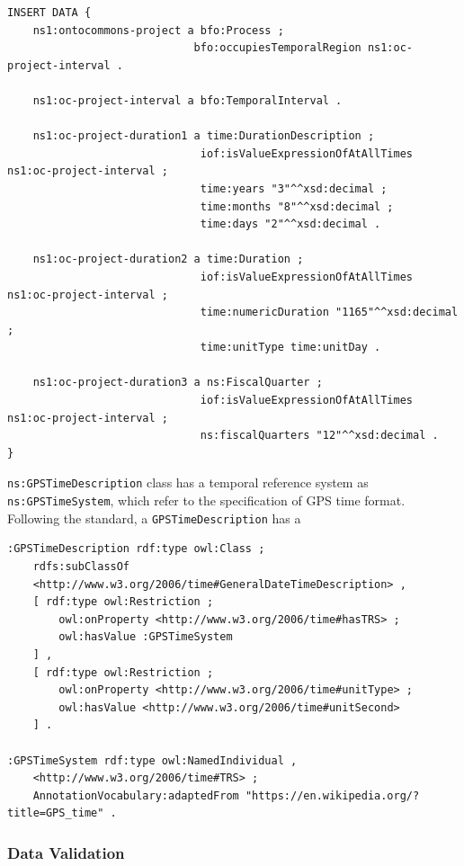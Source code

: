 \begin{verbatim}
INSERT DATA {
    ns1:ontocommons-project a bfo:Process ;
                             bfo:occupiesTemporalRegion ns1:oc-project-interval .

    ns1:oc-project-interval a bfo:TemporalInterval .

    ns1:oc-project-duration1 a time:DurationDescription ;
                              iof:isValueExpressionOfAtAllTimes ns1:oc-project-interval ;
                              time:years "3"^^xsd:decimal ;
                              time:months "8"^^xsd:decimal ;
                              time:days "2"^^xsd:decimal .

    ns1:oc-project-duration2 a time:Duration ;
                              iof:isValueExpressionOfAtAllTimes ns1:oc-project-interval ;
                              time:numericDuration "1165"^^xsd:decimal ;
                              time:unitType time:unitDay .

    ns1:oc-project-duration3 a ns:FiscalQuarter ;
                              iof:isValueExpressionOfAtAllTimes ns1:oc-project-interval ;
                              ns:fiscalQuarters "12"^^xsd:decimal .
}
\end{verbatim}

\texttt{ns:GPSTimeDescription} class has a temporal reference system as \texttt{ns:GPSTimeSystem}, which refer to the specification of GPS time format. Following the standard, a \texttt{GPSTimeDescription} has a 

\begin{verbatim}
:GPSTimeDescription rdf:type owl:Class ;
    rdfs:subClassOf 
    <http://www.w3.org/2006/time#GeneralDateTimeDescription> ,
    [ rdf:type owl:Restriction ;
        owl:onProperty <http://www.w3.org/2006/time#hasTRS> ;
        owl:hasValue :GPSTimeSystem
    ] ,
    [ rdf:type owl:Restriction ;
        owl:onProperty <http://www.w3.org/2006/time#unitType> ;
        owl:hasValue <http://www.w3.org/2006/time#unitSecond>
    ] .    

:GPSTimeSystem rdf:type owl:NamedIndividual ,
    <http://www.w3.org/2006/time#TRS> ;
    AnnotationVocabulary:adaptedFrom "https://en.wikipedia.org/?title=GPS_time" .
\end{verbatim}


\subsubsection*{Data Validation}

